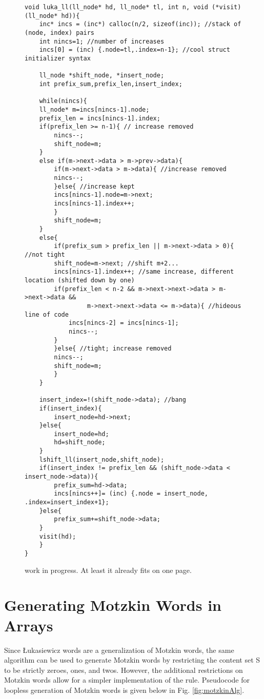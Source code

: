 


\begin{figure}[H]
\begin{Verbatim}
void luka_ll(ll_node* hd, ll_node* tl, int n, void (*visit)(ll_node* hd)){
    inc* incs = (inc*) calloc(n/2, sizeof(inc)); //stack of (node, index) pairs
    int nincs=1; //number of increases
    incs[0] = (inc) {.node=tl,.index=n-1}; //cool struct initializer syntax

    ll_node *shift_node, *insert_node;
    int prefix_sum,prefix_len,insert_index;

    while(nincs){
	ll_node* m=incs[nincs-1].node;
	prefix_len = incs[nincs-1].index;
	if(prefix_len >= n-1){ // increase removed
	    nincs--;
	    shift_node=m;
	}
	else if(m->next->data > m->prev->data){
	    if(m->next->data > m->data){ //increase removed
		nincs--;
	    }else{ //increase kept
		incs[nincs-1].node=m->next;
		incs[nincs-1].index++;
	    }
	    shift_node=m;
	}
	else{
	    if(prefix_sum > prefix_len || m->next->data > 0){ //not tight
		shift_node=m->next; //shift m+2...
		incs[nincs-1].index++; //same increase, different location (shifted down by one)
		if(prefix_len < n-2 && m->next->next->data > m->next->data && 
                 m->next->next->data <= m->data){ //hideous line of code
		    incs[nincs-2] = incs[nincs-1];
		    nincs--;
		}
	    }else{ //tight; increase removed
		nincs--;	
		shift_node=m;
	    }
	}

	insert_index=!(shift_node->data); //bang
	if(insert_index){
	    insert_node=hd->next;
	}else{
	    insert_node=hd;
	    hd=shift_node;
	}
	lshift_ll(insert_node,shift_node);
	if(insert_index != prefix_len && (shift_node->data < insert_node->data)){
	    prefix_sum=hd->data;
	    incs[nincs++]= (inc) {.node = insert_node, .index=insert_index+1};
	}else{
	    prefix_sum+=shift_node->data;
	}
	visit(hd);
    }
}
\end{Verbatim}

\caption{work in progress. At least it already fits on one page.}
\label{fig:lukaAlg}
\end{figure}


\section{Generating Motzkin Words in Arrays}
Since Łukasiewicz words are a generalization of Motzkin words, the same algorithm can be used to generate Motzkin words by restricting the content set S to be strictly zeroes, ones, and twos.  However, the additional restrictions on Motzkin words allow for a simpler implementation of the rule.   Pseudocode for loopless generation of Motzkin words is given below in Fig. \ref{fig:motzkinAlg}. 


